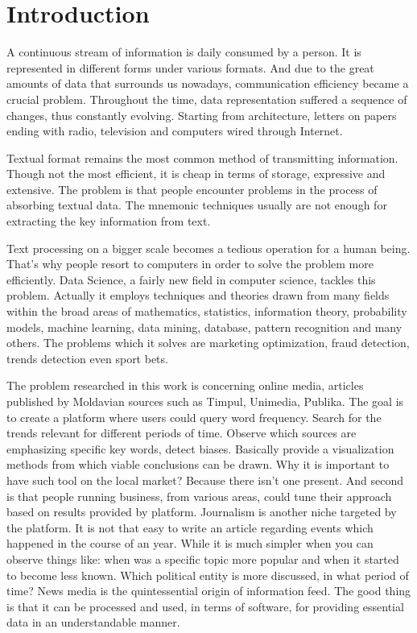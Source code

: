 \section*{Introduction}
A continuous stream of information is daily consumed by a person. It is represented in different forms under various formats. And due to the great amounts of data that surrounds us nowadays, communication efficiency became a crucial problem. Throughout the time, data representation suffered a sequence of changes, thus constantly evolving. Starting from architecture, letters on papers ending with radio, television and computers wired through Internet.

Textual format remains the most common method of transmitting information. Though not the most efficient, it is cheap in terms of storage, expressive and extensive. The problem is that people encounter problems in the process of absorbing textual data. The mnemonic techniques usually are not enough for extracting the key information from text.

Text processing on a bigger scale becomes a tedious operation for a human being. That's why people resort to computers in order to solve the problem more efficiently. Data Science, a fairly new field in computer science, tackles this problem. Actually it employs techniques and theories drawn from many fields within the broad areas of mathematics, statistics, information theory, probability models, machine learning, data mining, database, pattern recognition and many others. The problems which it solves are marketing optimization, fraud detection, trends detection even sport bets.

The problem researched in this work is concerning online media, articles published by Moldavian sources such as Timpul, Unimedia, Publika. The goal is to create a platform where users could query word frequency. Search for the trends relevant for different periods of time. Observe which sources are emphasizing specific key words, detect biases. Basically provide a visualization methods from which viable conclusions can be drawn. Why it is important to have such tool on the local market? Because there isn't one present. And second is that people running business, from various areas, could tune their approach based on results provided by platform. Journalism is another niche targeted by the platform. It is not that easy to write an article regarding events which happened in the course of an year. While it is much simpler when you can observe things like: when was a specific topic more popular and when it started to become less known. Which political entity is more discussed, in what period of time? News media is the quintessential origin of information feed. The good thing is that it can be processed and used, in terms of software, for providing essential data in an understandable manner.

